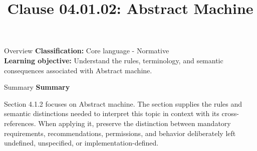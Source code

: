 \documentclass[10pt,letterpaper]{article}
\title{Clause 04.01.02: Abstract Machine}
\author{}
\date{}
\begin{document}
\maketitle
\begin{CornellOverviewBox}{Overview}
\textbf{Classification:} Core language - Normative\\[2pt]
\textbf{Learning objective:} Understand the rules, terminology, and semantic consequences associated with Abstract machine.
\end{CornellOverviewBox}\begin{CornellSummaryBox}{Summary}
{\sffamily\bfseries\color{Accent} Summary}\par\vspace{3pt}Section 4.1.2 focuses on Abstract machine. The section supplies the rules and semantic distinctions needed to interpret this topic in context with its cross-references. When applying it, preserve the distinction between mandatory requirements, recommendations, permissions, and behavior deliberately left undefined, unspecified, or implementation-defined.
\end{CornellSummaryBox}
\end{document}
